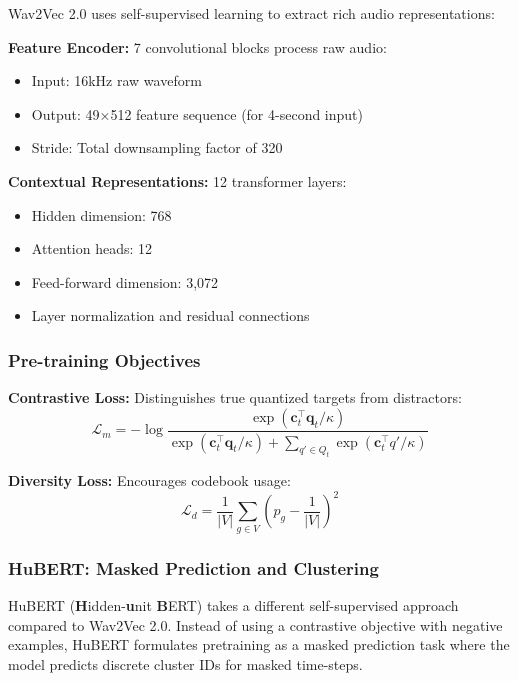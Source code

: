 \documentclass[conference]{IEEEtran}
\begin{document}
Wav2Vec 2.0 uses self-supervised learning to extract rich audio representations:

\textbf{Feature Encoder:} 7 convolutional blocks process raw audio:
\begin{itemize}
  \item Input: 16kHz raw waveform
  \item Output: 49×512 feature sequence (for 4-second input)
  \item Stride: Total downsampling factor of 320
\end{itemize}

\textbf{Contextual Representations:} 12 transformer layers:
\begin{itemize}
  \item Hidden dimension: 768
  \item Attention heads: 12
  \item Feed-forward dimension: 3,072
  \item Layer normalization and residual connections
\end{itemize}

\subsubsection{Pre-training Objectives}
\label{sec:q2_wav2vec_pretraining}

\textbf{Contrastive Loss:} Distinguishes true quantized targets from distractors:
\begin{equation}
\mathcal{L}_m = -\log \frac{\exp(\mathbf{c}_t^\top \mathbf{q}_t / \kappa)}{\exp(\mathbf{c}_t^\top \mathbf{q}_t / \kappa) + \sum_{q' \in Q_t} \exp(\mathbf{c}_t^\top q' / \kappa)}
\end{equation}

\textbf{Diversity Loss:} Encourages codebook usage:
\begin{equation}
\mathcal{L}_d = \frac{1}{|V|} \sum_{g \in V} (p_g - \frac{1}{|V|})^2
\end{equation}

\subsubsection{HuBERT: Masked Prediction and Clustering}
\label{sec:q2_hubert}

HuBERT (\textbf{H}idden-\textbf{u}nit \textbf{B}ERT) takes a different self-supervised approach compared to Wav2Vec 2.0. Instead of using a contrastive objective with negative examples, HuBERT formulates pretraining as a masked prediction task where the model predicts discrete cluster IDs for masked time-steps.
\end{document}

